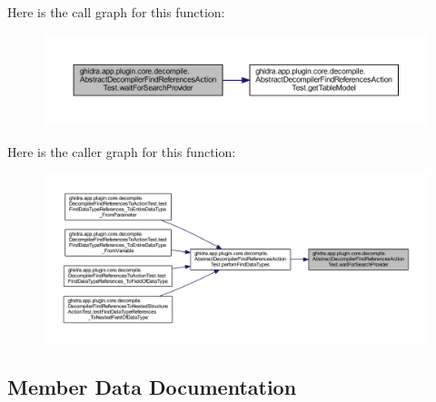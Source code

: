Here is the call graph for this function\+:
\nopagebreak
\begin{figure}[H]
\begin{center}
\leavevmode
\includegraphics[width=350pt]{classghidra_1_1app_1_1plugin_1_1core_1_1decompile_1_1_abstract_decompiler_find_references_action_test_a1c0949f31fc841f8f6bcfd44a1ed33c9_cgraph}
\end{center}
\end{figure}
Here is the caller graph for this function\+:
\nopagebreak
\begin{figure}[H]
\begin{center}
\leavevmode
\includegraphics[width=350pt]{classghidra_1_1app_1_1plugin_1_1core_1_1decompile_1_1_abstract_decompiler_find_references_action_test_a1c0949f31fc841f8f6bcfd44a1ed33c9_icgraph}
\end{center}
\end{figure}


\subsection{Member Data Documentation}
\mbox{\label{classghidra_1_1app_1_1plugin_1_1core_1_1decompile_1_1_abstract_decompiler_find_references_action_test_abd101d9164795cceef897f26ba6c0c1f}} 
